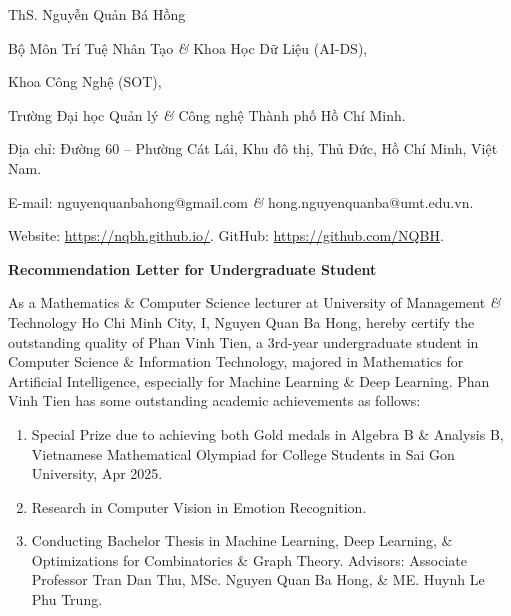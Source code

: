 \documentclass[11pt]{article}
\begin{document}
\begin{flushright}
    ThS. {\sc Nguyễn Quản Bá Hồng}
    
    Bộ Môn Trí Tuệ Nhân Tạo {\it\&} Khoa Học Dữ Liệu (AI-DS),
    
    Khoa Công Nghệ (SOT),
    
    Trường Đại học Quản lý {\it\&} Công nghệ Thành phố Hồ Chí Minh.
    
    Địa chỉ: Đường 60 -- Phường Cát Lái, Khu đô thị, Thủ Đức, Hồ Chí Minh, Việt Nam.
    
    E-mail: {\sf nguyenquanbahong@gmail.com} {\it\&} {\sf hong.nguyenquanba@umt.edu.vn}.
    
    Website: \url{https://nqbh.github.io/}. GitHub: \url{https://github.com/NQBH}.
\end{flushright}
\vspace{5mm}
\begin{center}
    \LARGE
    \textbf{\textsf{Recommendation Letter for Undergraduate Student}}
\end{center}
As a Mathematics \& Computer Science lecturer at University of Management {\it\&} Technology Ho Chi Minh City, I, {\sc Nguyen Quan Ba Hong}, hereby certify the outstanding quality of {\sc Phan Vinh Tien}, a 3rd-year undergraduate student in Computer Science \& Information Technology, majored in Mathematics for Artificial Intelligence, especially for Machine Learning \& Deep Learning. {\sc Phan Vinh Tien} has some outstanding academic achievements as follows:
\begin{enumerate}
    \item Special Prize due to achieving both Gold medals in Algebra B \& Analysis B, Vietnamese Mathematical Olympiad for College Students in Sai Gon University, Apr 2025.
    \item Research in Computer Vision in Emotion Recognition.
    \item Conducting Bachelor Thesis in Machine Learning, Deep Learning, \& Optimizations for Combinatorics \& Graph Theory. Advisors: Associate Professor {\sc Tran Dan Thu}, MSc. {\sc Nguyen Quan Ba Hong}, \& ME. {\sc Huynh Le Phu Trung}.
\end{enumerate}
\end{document}
